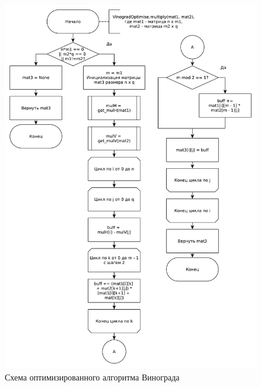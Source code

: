 \documentclass[a4paper,oneside,14pt]{extreport}
\begin{document}
\begin{figure}[H]
	\includegraphics[width=1\linewidth]{images/VinogradOptimise}
	\caption{Схема оптимизированного алгоритма Винограда}
	\label{fig:opt_vinograd}
\end{figure}
\end{document}
